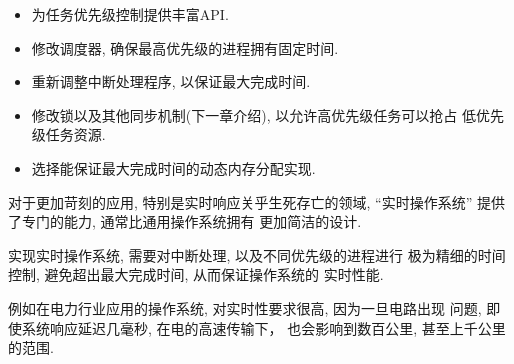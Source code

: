 \documentclass[12pt]{book}
\begin{document}
{\begin{itemize}

\item 为任务优先级控制提供丰富API. 

\item 修改调度器, 确保最高优先级的进程拥有固定时间. 

\item 重新调整中断处理程序, 以保证最大完成时间. 

\item 修改锁以及其他同步机制(下一章介绍), 以允许高优先级任务可以抢占
低优先级任务资源. 

\item 选择能保证最大完成时间的动态内存分配实现. 

\end{itemize}

对于更加苛刻的应用, 特别是实时响应关乎生死存亡的领域, 
``实时操作系统'' 提供了专门的能力, 通常比通用操作系统拥有
更加简洁的设计. 

\begin{note}
实现实时操作系统, 需要对中断处理, 以及不同优先级的进程进行
极为精细的时间控制, 避免超出最大完成时间, 从而保证操作系统的
实时性能.

例如在电力行业应用的操作系统, 对实时性要求很高, 因为一旦电路出现
问题, 即使系统响应延迟几毫秒, 在电的高速传输下， 也会影响到数百公里, 
甚至上千公里的范围.
\end{note}



}
\end{document}
